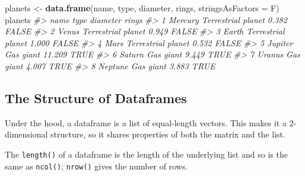 \documentclass[]{book}
\newenvironment{Shaded}{\begin{snugshade}}{\end{snugshade}}
\newcommand{\KeywordTok}[1]{\textcolor[rgb]{0.13,0.29,0.53}{\textbf{#1}}}
\newcommand{\DataTypeTok}[1]{\textcolor[rgb]{0.13,0.29,0.53}{#1}}
\newcommand{\DecValTok}[1]{\textcolor[rgb]{0.00,0.00,0.81}{#1}}
\newcommand{\StringTok}[1]{\textcolor[rgb]{0.31,0.60,0.02}{#1}}
\newcommand{\CommentTok}[1]{\textcolor[rgb]{0.56,0.35,0.01}{\textit{#1}}}
\newcommand{\OperatorTok}[1]{\textcolor[rgb]{0.81,0.36,0.00}{\textbf{#1}}}
\newcommand{\NormalTok}[1]{#1}
\begin{document}
\begin{Shaded}
\begin{Highlighting}[]
\NormalTok{planets <-}\StringTok{ }\KeywordTok{data.frame}\NormalTok{(name, type, diameter, rings, }\DataTypeTok{stringsAsFactors =}\NormalTok{ F)}
\NormalTok{planets}
\CommentTok{#>      name               type diameter rings}
\CommentTok{#> 1 Mercury Terrestrial planet    0.382 FALSE}
\CommentTok{#> 2   Venus Terrestrial planet    0.949 FALSE}
\CommentTok{#> 3   Earth Terrestrial planet    1.000 FALSE}
\CommentTok{#> 4    Mars Terrestrial planet    0.532 FALSE}
\CommentTok{#> 5 Jupiter          Gas giant   11.209  TRUE}
\CommentTok{#> 6  Saturn          Gas giant    9.449  TRUE}
\CommentTok{#> 7  Uranus          Gas giant    4.007  TRUE}
\CommentTok{#> 8 Neptune          Gas giant    3.883  TRUE}
\end{Highlighting}
\end{Shaded}

\subsection{The Structure of
Dataframes}\label{the-structure-of-dataframes}

Under the hood, a dataframe is a list of equal-length vectors. This
makes it a 2-dimensional structure, so it shares properties of both the
matrix and the list.

\begin{Shaded}
\end{Shaded}

The \texttt{length()} of a dataframe is the length of the underlying
list and so is the same as \texttt{ncol()}; \texttt{nrow()} gives the
number of rows.
\end{document}
